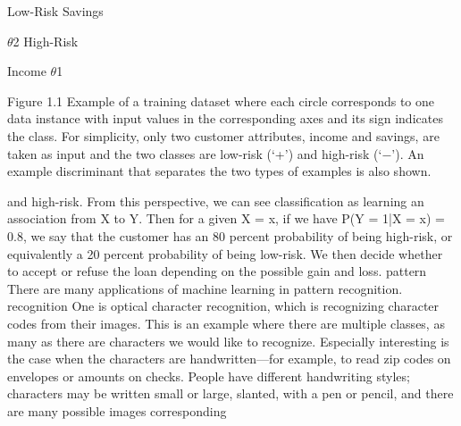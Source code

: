 Low-Risk Savings

$\theta$2 High-Risk

Income $\theta$1

Figure 1.1 Example of a training dataset where each circle corresponds to one data instance with input values in the corresponding axes and its sign indicates the class. For simplicity, only two customer attributes, income and savings, are taken as input and the two classes are low-risk (‘+’) and high-risk (‘$-$’). An example discriminant that separates the two types of examples is also shown.

and high-risk. From this perspective, we can see classification as learning an association from X to Y. Then for a given X = x, if we have P(Y = 1|X = x) = 0.8, we say that the customer has an 80 percent probability of being high-risk, or equivalently a 20 percent probability of being low-risk. We then decide whether to accept or refuse the loan depending on the possible gain and loss. pattern There are many applications of machine learning in pattern recognition. recognition One is optical character recognition, which is recognizing character codes from their images. This is an example where there are multiple classes, as many as there are characters we would like to recognize. Especially interesting is the case when the characters are handwritten---for example, to read zip codes on envelopes or amounts on checks. People have different handwriting styles; characters may be written small or large, slanted, with a pen or pencil, and there are many possible images corresponding

